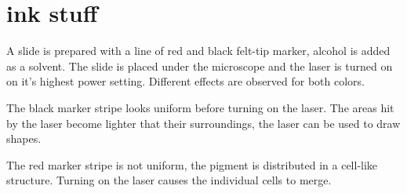 \section{ink stuff}
A slide is prepared with a line of red and black felt-tip marker, alcohol is added as a solvent.
The slide is placed under the microscope and the laser is turned on on it's highest power setting.
Different effects are observed for both colors.

The black marker stripe looks uniform before turning on the laser.
The areas hit by the laser become lighter that their surroundings, the laser can be used to draw shapes.

The red marker stripe is not uniform, the pigment is distributed in a cell-like structure.
Turning on the laser causes the individual cells to merge.

